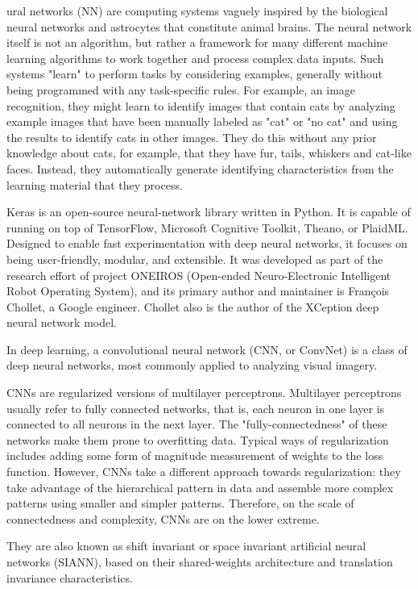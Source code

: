 \documentclass[journal]{IEEEtran}
\begin{document}
ural networks (NN) are computing systems vaguely inspired by the biological neural networks and astrocytes that constitute animal brains. The neural network itself is not an algorithm, but rather a framework for many different machine learning algorithms to work together and process complex data inputs. Such systems "learn" to perform tasks by considering examples, generally without being programmed with any task-specific rules. For example, an image recognition, they might learn to identify images that contain cats by analyzing example images that have been manually labeled as "cat" or "no cat" and using the results to identify cats in other images. They do this without any prior knowledge about cats, for example, that they have fur, tails, whiskers and cat-like faces. Instead, they automatically generate identifying characteristics from the learning material that they process.

Keras is an open-source neural-network library written in Python. It is capable of running on top of TensorFlow, Microsoft Cognitive Toolkit, Theano, or PlaidML. Designed to enable fast experimentation with deep neural networks, it focuses on being user-friendly, modular, and extensible. It was developed as part of the research effort of project ONEIROS (Open-ended Neuro-Electronic Intelligent Robot Operating System), and its primary author and maintainer is François Chollet, a Google engineer. Chollet also is the author of the XCeption deep neural network model.

In deep learning, a convolutional neural network (CNN, or ConvNet) is a class of deep neural networks, most commonly applied to analyzing visual imagery.

CNNs are regularized versions of multilayer perceptrons. Multilayer perceptrons usually refer to fully connected networks, that is, each neuron in one layer is connected to all neurons in the next layer. The "fully-connectedness" of these networks make them prone to overfitting data. Typical ways of regularization includes adding some form of magnitude measurement of weights to the loss function. However, CNNs take a different approach towards regularization: they take advantage of the hierarchical pattern in data and assemble more complex patterns using smaller and simpler patterns. Therefore, on the scale of connectedness and complexity, CNNs are on the lower extreme.

They are also known as shift invariant or space invariant artificial neural networks (SIANN), based on their shared-weights architecture and translation invariance characteristics.
\end{document}
